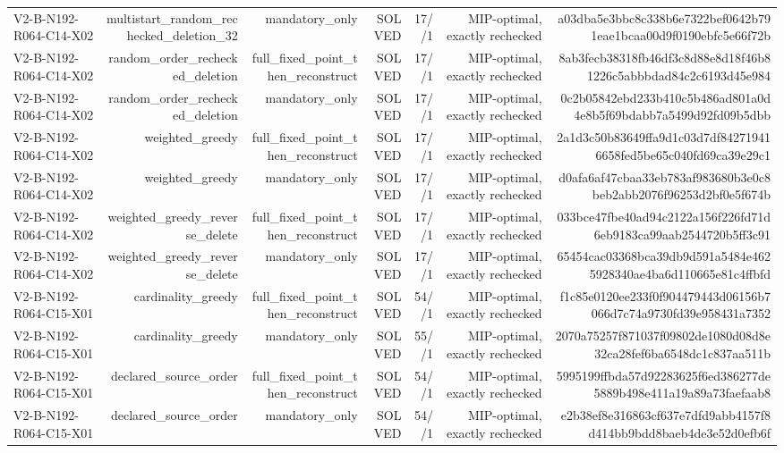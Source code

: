 {\begin{longtable}{lrrrrrr}
V2-B-N192-R064-C14-X02 & multistart\_random\_rechecked\_deletion\_32 & mandatory\_only & SOLVED & 17//1 & MIP-optimal, exactly rechecked & a03dba5e3bbc8c338b6e7322bef0642b791eae1bcaa00d9f0190ebfc5e66f72b \\
V2-B-N192-R064-C14-X02 & random\_order\_rechecked\_deletion & full\_fixed\_point\_then\_reconstruct & SOLVED & 17//1 & MIP-optimal, exactly rechecked & 8ab3fecb38318fb46df3c8d88e8d18f46b81226c5abbbdad84c2c6193d45e984 \\
V2-B-N192-R064-C14-X02 & random\_order\_rechecked\_deletion & mandatory\_only & SOLVED & 17//1 & MIP-optimal, exactly rechecked & 0c2b05842ebd233b410c5b486ad801a0d4e8b5f69bdabb7a5499d92fd09b5dbb \\
V2-B-N192-R064-C14-X02 & weighted\_greedy & full\_fixed\_point\_then\_reconstruct & SOLVED & 17//1 & MIP-optimal, exactly rechecked & 2a1d3c50b83649ffa9d1c03d7df842719416658fed5be65c040fd69ca39e29c1 \\
V2-B-N192-R064-C14-X02 & weighted\_greedy & mandatory\_only & SOLVED & 17//1 & MIP-optimal, exactly rechecked & d0afa6af47cbaa33eb783af983680b3e0c8beb2abb2076f96253d2bf0e5f674b \\
V2-B-N192-R064-C14-X02 & weighted\_greedy\_reverse\_delete & full\_fixed\_point\_then\_reconstruct & SOLVED & 17//1 & MIP-optimal, exactly rechecked & 033bce47fbe40ad94c2122a156f226fd71d6eb9183ca99aab2544720b5ff3c91 \\
V2-B-N192-R064-C14-X02 & weighted\_greedy\_reverse\_delete & mandatory\_only & SOLVED & 17//1 & MIP-optimal, exactly rechecked & 65454cac03368bca39db9d591a5484e4625928340ae4ba6d110665e81c4ffbfd \\
V2-B-N192-R064-C15-X01 & cardinality\_greedy & full\_fixed\_point\_then\_reconstruct & SOLVED & 54//1 & MIP-optimal, exactly rechecked & f1c85e0120ee233f0f904479443d06156b7066d7c74a9730fd39e958431a7352 \\
V2-B-N192-R064-C15-X01 & cardinality\_greedy & mandatory\_only & SOLVED & 55//1 & MIP-optimal, exactly rechecked & 2070a75257f871037f09802de1080d08d8e32ca28fef6ba6548dc1c837aa511b \\
V2-B-N192-R064-C15-X01 & declared\_source\_order & full\_fixed\_point\_then\_reconstruct & SOLVED & 54//1 & MIP-optimal, exactly rechecked & 5995199ffbda57d92283625f6ed386277de5889b498e411a19a89a73faefaab8 \\
V2-B-N192-R064-C15-X01 & declared\_source\_order & mandatory\_only & SOLVED & 54//1 & MIP-optimal, exactly rechecked & e2b38ef8e316863cf637e7dfd9abb4157f8d414bb9bdd8baeb4de3e52d0efb6f \\

\end{longtable}}
